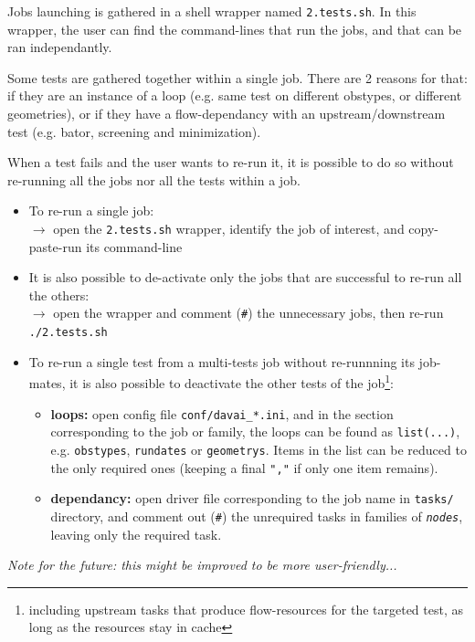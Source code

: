 \documentclass[a4paper,10pt,twoside]{article}
\begin{document}
Jobs launching is gathered in a shell wrapper named \texttt{2.tests.sh}.
In this wrapper, the user can find the command-lines that run the jobs, and that can be ran independantly.

Some tests are gathered together within a single job. There are 2 reasons for that: if they are an instance of a loop (e.g. same test on different obstypes, or different geometries), or if they have a flow-dependancy with an upstream/downstream test (e.g. bator, screening and minimization).

When a test fails and the user wants to re-run it, it is possible to do so without re-running all the jobs nor all the tests within a job.

\begin{itemize}
 \item To re-run a single job:\\
       $\rightarrow$ open the \texttt{2.tests.sh} wrapper, identify the job of interest, and copy-paste-run its command-line
 \item It is also possible to de-activate only the jobs that are successful to re-run all the others:\\
       $\rightarrow$ open the wrapper and comment (\texttt{\#}) the unnecessary jobs, then re-run \texttt{./2.tests.sh}
 \item To re-run a single test from a multi-tests job without re-runnning its job-mates, it is also possible to deactivate the other tests of the job\footnote{including upstream tasks that produce flow-resources for the targeted test, as long as the resources stay in cache}:
       \begin{itemize}[label=$\rightarrow$]
        \item \textbf{loops:} open config file \texttt{conf/davai\_*.ini}, and in the section corresponding to the job or family, the loops can be found as \texttt{list(...)}, e.g. \texttt{obstypes}, \texttt{rundates} or \texttt{geometrys}. Items in the list can be reduced to the only required ones (keeping a final \texttt{","} if only one item remains).
        \item \textbf{dependancy:} open driver file corresponding to the job name in \texttt{tasks/} directory, and comment out (\texttt{\#}) the unrequired tasks in families of \textit{\texttt{nodes}}, leaving only the required task.
       \end{itemize}
\end{itemize}

\textit{Note for the future: this might be improved to be more user-friendly...}
\end{document}

